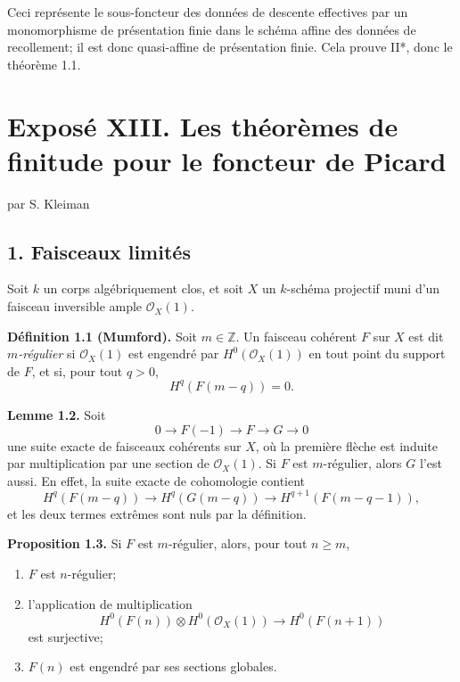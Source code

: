 \documentclass[11pt]{article}
\begin{document}
Ceci représente le sous-foncteur des données de descente effectives par un monomorphisme de présentation finie dans le schéma affine des données de recollement; il est donc quasi-affine de présentation finie. Cela prouve II*, donc le théorème 1.1.



\providecommand{\Ass}{\operatorname{Ass}}
\providecommand{\Hom}{\operatorname{Hom}}
\providecommand{\Ext}{\operatorname{Ext}}
\providecommand{\Proj}{\operatorname{Proj}}
\providecommand{\NS}{\operatorname{NS}}
\providecommand{\Tors}{\operatorname{Tors}}
\providecommand{\Picnum}{\operatorname{Pic}^{\mathrm{num}}}
\providecommand{\Piczero}{\operatorname{Pic}^{0}}
\providecommand{\Pictau}{\operatorname{Pic}^{\tau}}
\providecommand{\length}{\operatorname{length}}
\providecommand{\etale}{\text{\'etale}}


\section*{Expos\'e XIII. Les th\'eor\`emes de finitude pour le foncteur de Picard}
\begin{center}
par S. Kleiman
\end{center}

\subsection*{1. Faisceaux limit\'es}
Soit $k$ un corps alg\'ebriquement clos, et soit $X$ un $k$-sch\'ema projectif muni d'un faisceau inversible ample $\mathcal O_X(1)$.

\textbf{D\'efinition 1.1 (Mumford).} Soit $m\in\mathbb Z$. Un faisceau coh\'erent $F$ sur $X$ est dit \emph{$m$-r\'egulier} si $\mathcal O_X(1)$ est engendr\'e par $H^0(\mathcal O_X(1))$ en tout point du support de $F$, et si, pour tout $q>0$,
\[
 H^q(F(m-q))=0.
\]

\textbf{Lemme 1.2.} Soit
\[
0\longrightarrow F(-1)\longrightarrow F\longrightarrow G\longrightarrow 0
\]
une suite exacte de faisceaux coh\'erents sur $X$, o\`u la premi\`ere fl\`eche est induite par multiplication par une section de $\mathcal O_X(1)$. Si $F$ est $m$-r\'egulier, alors $G$ l'est aussi. En effet, la suite exacte de cohomologie contient
\[
H^q(F(m-q))\longrightarrow H^q(G(m-q))\longrightarrow H^{q+1}(F(m-q-1)),
\]
et les deux termes extr\^emes sont nuls par la d\'efinition.

\textbf{Proposition 1.3.} Si $F$ est $m$-r\'egulier, alors, pour tout $n\ge m$,
\begin{enumerate}[label=\roman*)]
\item $F$ est $n$-r\'egulier;
\item l'application de multiplication
\[
 H^0(F(n))\otimes H^0(\mathcal O_X(1))\longrightarrow H^0(F(n+1))
\]
est surjective;
\item $F(n)$ est engendr\'e par ses sections globales.
\end{enumerate}
\end{document}

